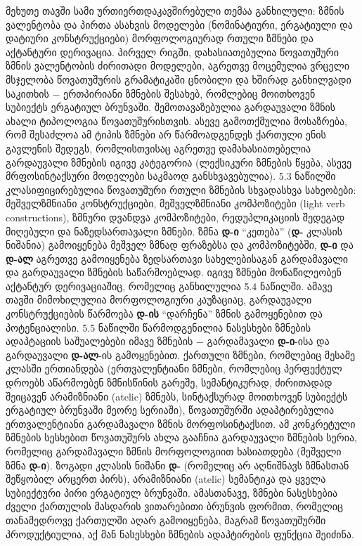 \begin{otherlanguage}{georgian}
	მეხუთე თავში სამი ურთიერთდაკავშირებული თემაა განხილული: ზმნის ვალენტობა და პირთა ასახვის მოდელები (ნომინატიური, ერგატიული და დატიური კონსტრუქციები)  მორფოლოგიურად რთული ზმნები და აქტანტური დერივაცია. პირველ რიგში, დახასიათებულია წოვათუშური ზმნის ვალენტობის ძირითადი მოდელები, აგრეთვე მოცემულია ვრცელი მსჯელობა წოვათუშურის გრამატიკაში ცნობილი და ხშირად განხილვადი საკითხის − ერთპირიანი ზმნების შესახებ, რომლებიც მოითხოვენ სუბიექტს ერგატიულ ბრუნვაში. შემოთავაზებულია  გარდაუვალი ზმნის ახალი ტიპოლოგია წოვათუშურისთვის. ასევე გამოთქმულია მოსაზრება, რომ შესაძლოა ამ ტიპის ზმნები არ წარმოადგენდეს ქართული ენის გავლენის შედეგს, რომლისთვისაც აგრეთვე დამახასიათებელია გარდაუვალი ზმნების იგივე კატეგორია (ლექსიკური ზმნების წყება, ასევე მრფოსინტაქსური მოდელები საკმაოდ განსხვავებულია). 5.3 ნაწილში კლასიფიცირებულია წოვათუშური რთული ზმნების სხვადასხვა სახეობები: მეშველზმნიანი კონსტრუქციები, მეშველზმნიანი კომპოზიტები (light verb constructions), ზმნური დვანდვა კომპოზიტები, რედუპლიკაციის შედეგად მიღებული და ნაზედსართავალი ზმნები. ზმნა \textbf{დ-ი} “კეთება” (\textbf{დ-} კლასის ნიშანია) გამოიყენება მეშველ ზმნად ფრაზებსა და კომპოზიტებში, \textbf{დ-ი} და \textbf{დ-ალ} აგრეთვე გამოიყენება  ზედსართავი სახელებისაგან გარდამავალი და გარდაუვალი ზმნების საწარმოებლად. იგივე ზმნები მონაწილეობენ აქტანტურ დერივაციაშიც, რომელიც განხილულია 5.4 ნაწილში. ამავე თავში მიმოხილულია მორფოლოგიური კაუზაციაც, გარდაუვალი კონსტრუქციების წარმოება \textbf{დ-ის} “დარჩენა” ზმნის გამოყენებით და პოტენციალისი. 5.5 ნაწილში წარმოდგენილია ნასესხები ზმნების ადაპტაციის საშუალებები  იმავე ზმნების −  გარდამავალი \textbf{დ-ი}-ისა და გარდაუვალი \textbf{დ-ალ}-ის გამოყენებით. ქართული ზმნები, რომლებიც მესამე კლასში ერთიანდება (ერთვალენტიანი ზმნები, რომლებიც პერფექტულ დროებს აწარმოებენ ზმნისწინის გარეშე, სემანტიკურად, ძირითადად შეიცავენ არამიზნიანი (atelic) ზმნებს, სინტაქსურად მოითხოვენ სუბიექტს ერგატიულ ბრუნვაში მეორე სერიაში), წოვათუშურში ადაპტირებულია ერთვალენტიანი გარდამავალი ზმნის მორფოსინტაქსით. ამ კონკრეტული ზმნების სესხებით წოვათუშურს ახლა გააჩნია გარდაუვალი ზმნების სერია, რომელიც გარდამავალი ზმნის მორფოლოგიით ხასიათდება (მეშველი ზმნა \textbf{დ-ი}). ზოგადი კლასის ნიშანი \textbf{დ-} (რომელიც არ აღნიშნავს ზმნასთან შეწყობილ არცერთ პირს), არამიზნიანი (atelic) სემანტიკა და ყველა სუბიექტური პირი ერგატიულ ბრუნვაში. ამასთანავე, ზმნები ნასესხებია ძველი ქართულის მასდარის ვითარებითი ბრუნვის ფორმით, რომელიც თანამედროვე ქართულში აღარ გამოიყენება, მაგრამ წოვათუშურში პროდუქტიულია, აქ მან ნასესხები ზმნების ადაპტირების ფუნქცია შეიძინა.



\end{otherlanguage}
